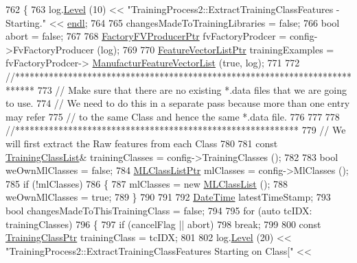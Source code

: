 \begin{DoxyCode}
762 \{
763   log.\hyperlink{class_k_k_b_1_1_run_log_a32cf761d7f2e747465fd80533fdbb659}{Level} (10) << \textcolor{stringliteral}{"TrainingProcess2::ExtractTrainingClassFeatures - Starting."} << 
      \hyperlink{namespace_k_k_b_ad1f50f65af6adc8fa9e6f62d007818a8}{endl};
764 
765   changesMadeToTrainingLibraries = \textcolor{keyword}{false};
766   \textcolor{keywordtype}{bool}   abort = \textcolor{keyword}{false};
767 
768   \hyperlink{class_k_k_m_l_l_1_1_factory_f_v_producer}{FactoryFVProducerPtr}  fvFactoryProdcer = config->FvFactoryProducer (log);
769 
770   \hyperlink{class_k_k_m_l_l_1_1_feature_vector_list}{FeatureVectorListPtr}  trainingExamples = fvFactoryProdcer->
      \hyperlink{class_k_k_m_l_l_1_1_factory_f_v_producer_a96126b7adb55f6751450ede393c93086}{ManufacturFeatureVectorList} (\textcolor{keyword}{true}, log);
771 
772   \textcolor{comment}{//****************************************************************************}
773   \textcolor{comment}{// Make sure that there are no existing *.data files that we are going to use.}
774   \textcolor{comment}{// We need to do this in a separate pass because more than one entry may refer }
775   \textcolor{comment}{// to the same Class and hence the same *.data file.}
776 
777 
778   \textcolor{comment}{//***********************************************************}
779   \textcolor{comment}{//  We will first extract the Raw features from each Class }
780 
781   \textcolor{keyword}{const} \hyperlink{class_k_k_m_l_l_1_1_training_class_list}{TrainingClassList}&   trainingClasses = config->TrainingClasses ();
782 
783   \textcolor{keywordtype}{bool}  weOwnMlClasses = \textcolor{keyword}{false}; 
784   \hyperlink{class_k_k_m_l_l_1_1_m_l_class_list}{MLClassListPtr} mlClasses = config->MlClasses ();
785   \textcolor{keywordflow}{if}  (!mlClasses)
786   \{
787     mlClasses = \textcolor{keyword}{new} \hyperlink{class_k_k_m_l_l_1_1_m_l_class_list}{MLClassList} ();
788     weOwnMlClasses = \textcolor{keyword}{true};
789   \}
790 
791 
792   \hyperlink{class_k_k_b_1_1_date_time}{DateTime}  latestTimeStamp;
793   \textcolor{keywordtype}{bool}      changesMadeToThisTrainingClass = \textcolor{keyword}{false};
794 
795   \textcolor{keywordflow}{for}  (\textcolor{keyword}{auto}  tcIDX: trainingClasses)
796   \{
797     \textcolor{keywordflow}{if}  (cancelFlag ||  abort)
798       \textcolor{keywordflow}{break};
799 
800     \textcolor{keyword}{const} \hyperlink{class_k_k_m_l_l_1_1_training_class}{TrainingClassPtr} trainingClass = tcIDX;
801 
802     log.\hyperlink{class_k_k_b_1_1_run_log_a32cf761d7f2e747465fd80533fdbb659}{Level} (20) << \textcolor{stringliteral}{"TrainingProcess2::ExtractTrainingClassFeatures Starting on Class["} << 

\end{DoxyCode}
